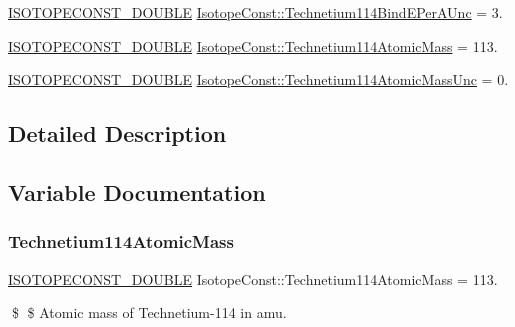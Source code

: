 \begin{DoxyCompactItemize}
\item 
\mbox{\hyperlink{group___isotope_const-_macros_ga8f45a7272ce02c0b4c65c44636ed719a}{I\+S\+O\+T\+O\+P\+E\+C\+O\+N\+S\+T\+\_\+\+D\+O\+U\+B\+LE}} \mbox{\hyperlink{group___isotope_const-_technetium-_tc114_ga2bfcfef6d5e663339821148191ede347}{Isotope\+Const\+::\+Technetium114\+Bind\+E\+Per\+A\+Unc}} = 3.
\item 
\mbox{\hyperlink{group___isotope_const-_macros_ga8f45a7272ce02c0b4c65c44636ed719a}{I\+S\+O\+T\+O\+P\+E\+C\+O\+N\+S\+T\+\_\+\+D\+O\+U\+B\+LE}} \mbox{\hyperlink{group___isotope_const-_technetium-_tc114_ga3abc32d7fc1d62cd32295a8705aa0f58}{Isotope\+Const\+::\+Technetium114\+Atomic\+Mass}} = 113.
\item 
\mbox{\hyperlink{group___isotope_const-_macros_ga8f45a7272ce02c0b4c65c44636ed719a}{I\+S\+O\+T\+O\+P\+E\+C\+O\+N\+S\+T\+\_\+\+D\+O\+U\+B\+LE}} \mbox{\hyperlink{group___isotope_const-_technetium-_tc114_gadfe82c4c66b5a00e6ca4c391ee445653}{Isotope\+Const\+::\+Technetium114\+Atomic\+Mass\+Unc}} = 0.
\end{DoxyCompactItemize}


\subsection{Detailed Description}


\subsection{Variable Documentation}
\mbox{\label{group___isotope_const-_technetium-_tc114_ga3abc32d7fc1d62cd32295a8705aa0f58}} 
\subsubsection{\texorpdfstring{Technetium114\+Atomic\+Mass}{Technetium114AtomicMass}}
{\footnotesize\ttfamily \mbox{\hyperlink{group___isotope_const-_macros_ga8f45a7272ce02c0b4c65c44636ed719a}{I\+S\+O\+T\+O\+P\+E\+C\+O\+N\+S\+T\+\_\+\+D\+O\+U\+B\+LE}} Isotope\+Const\+::\+Technetium114\+Atomic\+Mass = 113.}

\$ \$ Atomic mass of Technetium-\/114 in amu. \mbox{\label{group___isotope_const-_technetium-_tc114_gadfe82c4c66b5a00e6ca4c391ee445653}} 
